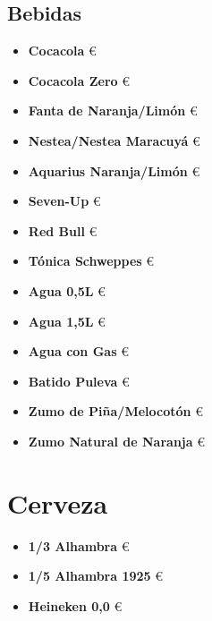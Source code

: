\documentclass[a4paper,12pt]{article}
\begin{document}
\begin{multicols}{2}
\section*{ Bebidas}
\begin{itemize}
    \item \textbf{Cocacola}  €
    \item \textbf{Cocacola Zero}  €
    \item \textbf{Fanta de Naranja/Limón}  €
    \item \textbf{Nestea/Nestea Maracuyá}  €
    \item \textbf{Aquarius Naranja/Limón}  €
    \item \textbf{Seven-Up}  €
    \item \textbf{Red Bull}  €
    \item \textbf{Tónica Schweppes}  €
    \item \textbf{Agua 0,5L}  €
    \item \textbf{Agua 1,5L}  €
    \item \textbf{Agua con Gas}  €
    \item \textbf{Batido Puleva}  €
    \item \textbf{Zumo de Piña/Melocotón}  €
    \item \textbf{Zumo Natural de Naranja}  €
\end{itemize}
\end{multicols}

\section*{Cerveza}
\begin{itemize}
    \item \textbf{1/3 Alhambra}  €
    \item \textbf{1/5 Alhambra 1925}  €
    \item \textbf{Heineken 0,0}  €
\end{itemize}
\end{document}
